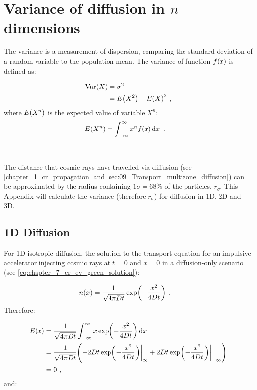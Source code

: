 \chapter{Variance of diffusion in $n$ dimensions} \label{sec:A5_variance}

The variance is a measurement of dispersion, comparing the standard deviation of a random variable to the population mean. The variance of function $f\qty(x)$ is defined as:

\begin{equation}
    \begin{aligned}
        \mathrm{Var}\qty(X)&=\sigma^2 \\
        &=E\qty(X^2)-E\qty(X)^2 \text{ ,} 
    \end{aligned}
\end{equation}
\noindent where $E\qty(X^n)$ is the expected value of variable $X^n$:
\begin{equation}
    \begin{aligned}
        E\qty(X^n)&=\int_{-\infty}^\infty x^nf\qty(x)\dd{x}\text{ .}
    \end{aligned}
\end{equation}
\par~\par 
The distance that cosmic rays have travelled via diffusion (see \autoref{chapter_1_cr_propagation} and \autoref{sec:09_Transport_multizone_diffusion}) can be approximated by the radius containing $1\sigma=68\%$ of the particles, $r_\sigma$. This Appendix will calculate the variance (therefore $r_\sigma$) for diffusion in 1D, 2D and 3D. 

\section{1D Diffusion}

\noindent For 1D isotropic diffusion, the solution to the transport equation for an impulsive accelerator injecting cosmic rays at $t=0$ and $x=0$ in a diffusion-only scenario (see \autoref{eq:chapter_7_cr_ev_green_solution}):

\begin{equation}
    \begin{aligned}
        n\qty(x)&=\frac{1}{\sqrt{4\pi Dt}}\exp(-\frac{x^2}{4Dt})\text{ .} 
    \end{aligned}
\end{equation}
\noindent Therefore:

\begin{equation}
    \begin{aligned}
        E\qty(x)&=\frac{1}{\sqrt{4\pi Dt}}\int_{-\infty}^\infty x\exp(-\frac{x^2}{4Dt})\dd{x} \\
        &=\frac{1}{\sqrt{4\pi Dt}}\qty(-2Dt\exp(-\frac{x^2}{4Dt})\bigg|_\infty+2Dt\exp(-\frac{x^2}{4Dt})\bigg|_{-\infty}) \\
        &=0\text{ ,} 
    \end{aligned}
\end{equation}
\noindent and:

